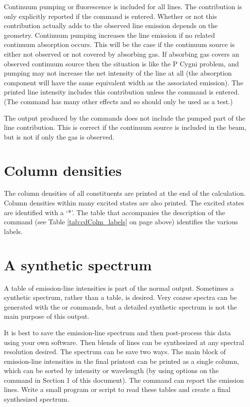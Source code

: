Continuum pumping or fluorescence is included for all lines.
The contribution is only explicitly reported if the
 command is entered.
Whether or not this contribution actually adds to the observed
line emission depends on the geometry.
Continuum pumping increases the
line emission if no related continuum absorption occurs.
This will be the
case if the continuum source is either not observed or not covered by
absorbing gas.
If absorbing gas covers an observed continuum source then
the situation is like the P Cygni problem, and pumping may not increase
the net intensity of the line at all (the absorption component will have
the same equivalent width as the associated emission).
The printed line
intensity includes this contribution unless the
 command is entered.
(The  command has many other effects and
so should only be used as a test.)

The output produced by the  commands
does not include
the pumped part of the line contribution.
This is correct if the continuum
source is included in the beam, but is not if only the gas is observed.

\section{Column densities}

The column densities of all constituents are printed at the end of the
calculation.
Column densities within many excited states are also printed.
The excited states are identified with a `*'.
The table that
accompanies the description of the  command
(see Table \ref{tab:cdColm_labels} on page
\pageref{tab:cdColm_labels} above)
identifies the various labels.

\section{A synthetic spectrum}

A table of emission-line intensities is part of the normal output.
Sometimes a synthetic spectrum, rather than a table, is desired.
Very coarse
spectra can be generated with the  or
 commands,
but a detailed synthetic spectrum is not the main purpose of this output.

It is best to save the emission-line spectrum and then post-process this
data using your own software.  Then blends of lines can be synthesized at
any spectral resolution desired.
The spectrum can be save two ways.
The main block of emission-line intensities in the final printout
can be printed as a single column, which can be sorted by intensity
or wavelength (by using
options on the  command in Section 1 of this document).
The
 command can report the emission lines.
Write a small program or script to read these tables and create a final
synthesized spectrum.

